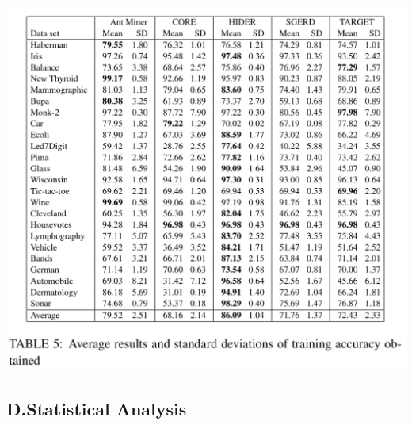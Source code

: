 \documentclass{beamer}
\begin{document}
\begin{CJK*}{UTF8}{bsmi}
\begin{frame}
	\begin{center}
		\includegraphics[height=.7\textheight]{./10.png}
	\end{center}
\end{frame}

\subsection{D.Statistical Analysis}



\end{CJK*}
\end{document}
